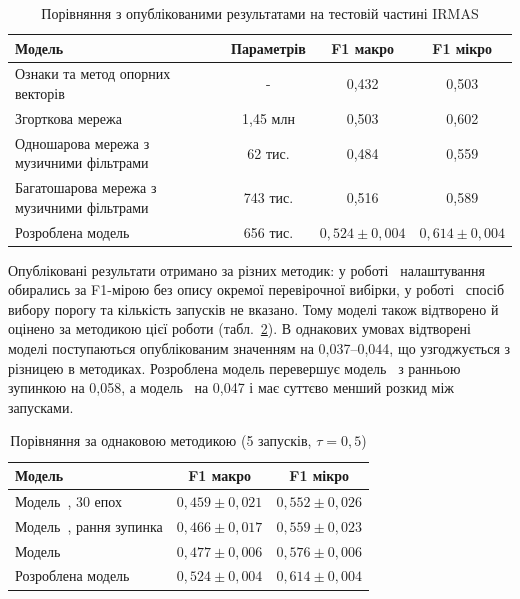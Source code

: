 \begin{table}[H]
\centering
\caption{Порівняння з опублікованими результатами на тестовій частині IRMAS}
\label{tab:comparison}
\small
\begin{tabular}{|p{6.6cm}|c|c|c|}
\hline
Модель & Параметрів & F1 макро & F1 мікро \\
\hline
Ознаки та метод опорних векторів~\cite{irmas2012} & - & 0,432 & 0,503 \\
Згорткова мережа~\cite{han2017}                    & 1,45 млн & 0,503 & 0,602 \\
Одношарова мережа з музичними фільтрами~\cite{pons2017} & 62 тис. & 0,484 & 0,559 \\
Багатошарова мережа з музичними фільтрами~\cite{pons2017} & 743 тис. & 0,516 & 0,589 \\
\hline
Розроблена модель & 656 тис. & $0{,}524 \pm 0{,}004$ & $0{,}614 \pm 0{,}004$ \\
\hline
\end{tabular}
\end{table}

Опубліковані результати отримано за різних методик: у
роботі~\cite{han2017} налаштування обирались за F1-мірою без опису
окремої перевірочної вибірки, у роботі~\cite{pons2017} спосіб вибору
порогу та кількість запусків не вказано. Тому моделі також відтворено й
оцінено за методикою цієї роботи (табл.~\ref{tab:repro}). В однакових
умовах відтворені моделі поступаються опублікованим значенням на
0,037--0,044, що узгоджується з різницею в методиках. Розроблена
модель перевершує модель~\cite{han2017} з ранньою зупинкою на 0,058, а
модель~\cite{pons2017} на 0,047 і має суттєво менший розкид між
запусками.

\begin{table}[H]
\centering
\caption{Порівняння за однаковою методикою (5 запусків, $\tau = 0{,}5$)}
\label{tab:repro}
\begin{tabular}{|l|c|c|}
\hline
Модель & F1 макро & F1 мікро \\
\hline
Модель~\cite{han2017}, 30 епох             & $0{,}459 \pm 0{,}021$ & $0{,}552 \pm 0{,}026$ \\
Модель~\cite{han2017}, рання зупинка       & $0{,}466 \pm 0{,}017$ & $0{,}559 \pm 0{,}023$ \\
Модель~\cite{pons2017}                      & $0{,}477 \pm 0{,}006$ & $0{,}576 \pm 0{,}006$ \\
\hline
Розроблена модель               & $0{,}524 \pm 0{,}004$ & $0{,}614 \pm 0{,}004$ \\
\hline
\end{tabular}
\end{table}

